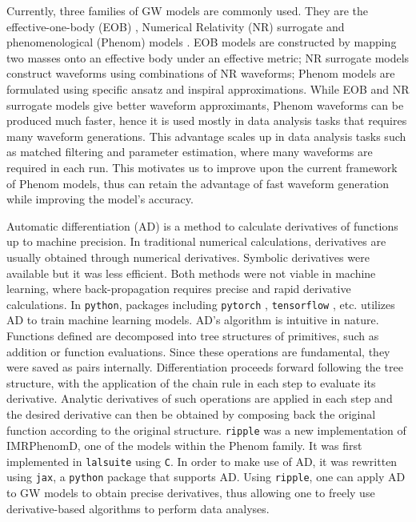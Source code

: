 \documentclass[twocolumn]{aastex631}
\newcommand{\ripple}{\texttt{ripple}}
\newcommand{\python}{\texttt{python}}
\newcommand{\jax}{\texttt{jax}}
\begin{document}
Currently, three families of GW models are commonly used. They are the
effective-one-body (EOB) \citep{ossokine2020multipolar, cotesta2020frequency, taracchini2014effective}, Numerical Relativity
(NR) surrogate \citep{islam2022surrogate, varma2019surrogate, varma2019surrogate2} and phenomenological (Phenom) models
\citep{husa2016frequency, khan2016frequency, garcia2020multimode, pratten2021computationally}. 
EOB models are constructed by mapping two masses onto an
effective body under an effective metric; NR surrogate models construct
waveforms using combinations of NR waveforms; Phenom models are formulated using
specific ansatz and inspiral approximations. While EOB and NR surrogate models
give better waveform approximants, Phenom waveforms can be produced much faster,
hence it is used mostly in data analysis tasks that requires many waveform
generations. This advantage scales up in data analysis tasks such as matched
filtering and parameter estimation, where many waveforms are required in each
run. This motivates us to improve upon the current framework of Phenom models,
thus can retain the advantage of fast waveform generation while improving the
model's accuracy. 

Automatic differentiation (AD) is a method to calculate derivatives of functions
up to machine precision. In traditional numerical calculations, derivatives are
usually obtained through numerical derivatives. Symbolic derivatives were
available but it was less efficient. Both methods were not viable in machine
learning, where back-propagation requires precise and rapid derivative
calculations. In {\python}, packages including \texttt{pytorch} \citep{pytorch},
\texttt{tensorflow} \citep{tensorflow2015-whitepaper}, etc. utilizes AD to train
machine learning models. AD's algorithm is intuitive in nature. Functions
defined are decomposed into tree structures of primitives, such as addition or
function evaluations. Since these operations are fundamental, they were saved as
pairs internally. Differentiation proceeds forward following the tree structure,
with the application of the chain rule in each step to evaluate its derivative.
Analytic derivatives of such operations are applied in each step and the desired
derivative can then be obtained by composing back the original function
according to the original structure. {\ripple} \citep{ripple} was a new
implementation of IMRPhenomD, one of the models within the Phenom family. It was first implemented
in \texttt{lalsuite} using \texttt{C}. In order to make use of AD, it was
rewritten using \jax, a {\python} package that supports AD. Using
{\ripple}, one can apply AD to GW models to obtain precise derivatives, thus
allowing one to freely use derivative-based algorithms to perform data analyses. 
\end{document}
